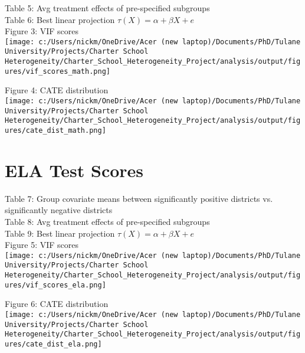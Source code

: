 \documentclass{article} %
\begin{document}
Table 5: Avg treatment effects of pre-specified subgroups \\


Table 6: Best linear projection $\tau(X) = \alpha + \beta X + e$\\


Figure 3: VIF scores\\
\texttt{[image: c:/Users/nickm/OneDrive/Acer (new laptop)/Documents/PhD/Tulane University/Projects/Charter School Heterogeneity/Charter\_School\_Heterogeneity\_Project/analysis/output/figures/vif\_scores\_math.png]}
	
Figure 4: CATE distribution\\
\texttt{[image: c:/Users/nickm/OneDrive/Acer (new laptop)/Documents/PhD/Tulane University/Projects/Charter School Heterogeneity/Charter\_School\_Heterogeneity\_Project/analysis/output/figures/cate\_dist\_math.png]}

\section{ELA Test Scores}
	
	
Table 7: Group covariate means between significantly positive districts vs. significantly negative districts\\



Table 8: Avg treatment effects of pre-specified subgroups\\


Table 9: Best linear projection $\tau(X) = \alpha + \beta X + e$\\


Figure 5: VIF scores\\
\texttt{[image: c:/Users/nickm/OneDrive/Acer (new laptop)/Documents/PhD/Tulane University/Projects/Charter School Heterogeneity/Charter\_School\_Heterogeneity\_Project/analysis/output/figures/vif\_scores\_ela.png]}
	
Figure 6: CATE distribution\\
\texttt{[image: c:/Users/nickm/OneDrive/Acer (new laptop)/Documents/PhD/Tulane University/Projects/Charter School Heterogeneity/Charter\_School\_Heterogeneity\_Project/analysis/output/figures/cate\_dist\_ela.png]}

	
	

	
	

	
	
	 
	

	
	
	


	




	 

 
\end{document}
